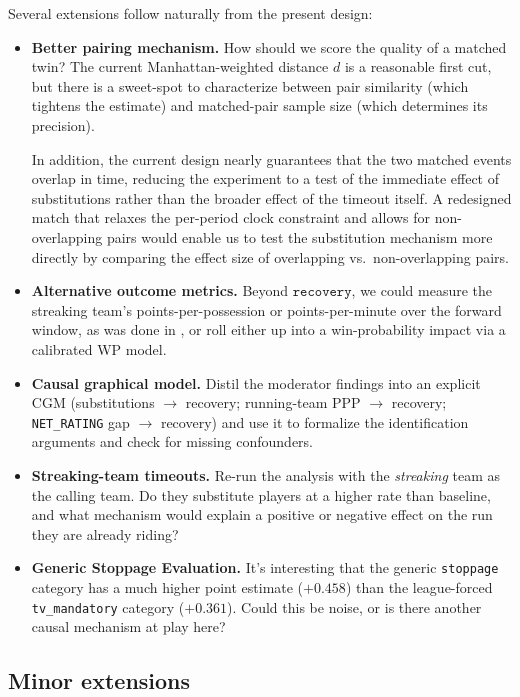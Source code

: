 \documentclass[twoside,11pt]{article}
\begin{document}
Several extensions follow naturally from the present design:
\begin{itemize}
		\item \textbf{Better pairing mechanism.} How should we score the quality of a matched twin? The
				current Manhattan-weighted distance $d$ is a reasonable first cut, but there is a sweet-spot
				to characterize between pair similarity (which tightens the estimate) and matched-pair
				sample size (which determines its precision).

				In addition, the current design nearly guarantees that the two matched events overlap in time, reducing
				the experiment to a test of the immediate effect of substitutions rather than the broader effect of the
				timeout itself. A redesigned match that relaxes the per-period clock constraint and allows for
				non-overlapping pairs would enable us to test the substitution mechanism more directly by comparing the
				effect size of overlapping vs.\ non-overlapping pairs.
		\item \textbf{Alternative outcome metrics.} Beyond $\texttt{recovery}$, we could measure the
				streaking team's points-per-possession or points-per-minute over the forward window, as was done in
				\citet{weimer2023causal}, or roll
				either up into a win-probability impact via a calibrated WP model.
		\item \textbf{Causal graphical model.} Distil the moderator findings into an explicit CGM
				(substitutions $\to$ recovery; running-team PPP $\to$ recovery; \texttt{NET\_RATING} gap
				$\to$ recovery) and use it to formalize the identification arguments and check for missing
				confounders.
		\item \textbf{Streaking-team timeouts.} Re-run the analysis with the \emph{streaking} team as the
				calling team. Do they substitute players at a higher rate than baseline, and what mechanism
				would explain a positive or negative effect on the run they are already riding?
		\item \textbf{Generic Stoppage Evaluation.} It's interesting that the generic \texttt{stoppage} category
				has a much higher point estimate ($+0.458$) than the league-forced \texttt{tv\_mandatory} category
				($+0.361$). Could this be noise, or is there another causal mechanism at play here?
\end{itemize}

\subsection{Minor extensions}
\end{document}
